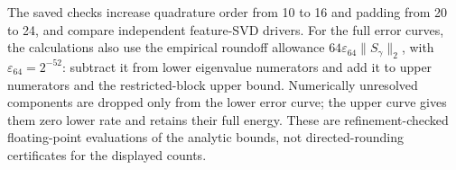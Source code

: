 The saved checks increase quadrature order from 10 to 16 and padding
from 20 to 24, and compare independent feature-SVD drivers.
For the full error curves, the calculations also use the empirical
roundoff allowance $64\varepsilon_{64}\|S_\gamma\|_2$, with
$\varepsilon_{64}=2^{-52}$: subtract it from lower eigenvalue numerators
and add it to upper numerators and the restricted-block upper bound.
Numerically unresolved components are dropped only from the lower error
curve; the upper curve gives them zero lower rate and retains their full energy.
These are refinement-checked floating-point evaluations of the analytic
bounds, not directed-rounding certificates for the displayed counts.
